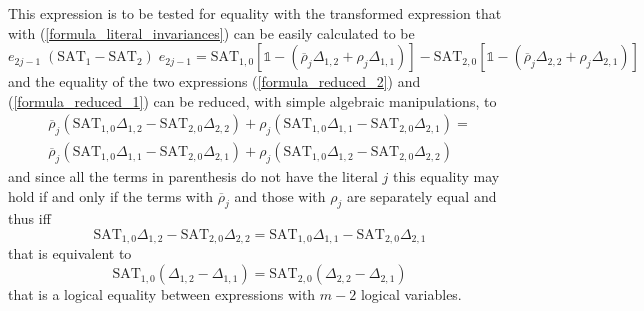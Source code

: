 \documentclass[a4paper,twoside,11pt]{article}
\begin{document}
This expression is to be tested for equality with the transformed expression that with (\ref{formula_literal_invariances}) can be easily calculated to be
\begin{equation}
\label{formula_reduced_2}
{e}_{2 j - 1} \; ({\ensuremath{\mbox{SAT}}}_1 - {\ensuremath{\mbox{SAT}}}_2) \; {e}_{2 j - 1} = {\ensuremath{\mbox{SAT}}}_{1,0} \left[{\ensuremath{\mathbb{1}}} - ({\overline{\ensuremath{\rho}}}_j \Delta_{1,2} + {\ensuremath{\rho}}_j \Delta_{1,1})\right] -  {\ensuremath{\mbox{SAT}}}_{2,0} \left[{\ensuremath{\mathbb{1}}} - ({\overline{\ensuremath{\rho}}}_j \Delta_{2,2} + {\ensuremath{\rho}}_j \Delta_{2,1})\right]
\end{equation}
and the equality of the two expressions (\ref{formula_reduced_2}) and (\ref{formula_reduced_1}) can be reduced, with simple algebraic manipulations, to
$$
\begin{array}{l}
{\overline{\ensuremath{\rho}}}_j ({\ensuremath{\mbox{SAT}}}_{1,0} \Delta_{1,2} - {\ensuremath{\mbox{SAT}}}_{2,0} \Delta_{2,2}) + {\ensuremath{\rho}}_j ({\ensuremath{\mbox{SAT}}}_{1,0} \Delta_{1,1} - {\ensuremath{\mbox{SAT}}}_{2,0} \Delta_{2,1}) = \\
{\overline{\ensuremath{\rho}}}_j ({\ensuremath{\mbox{SAT}}}_{1,0} \Delta_{1,1} - {\ensuremath{\mbox{SAT}}}_{2,0} \Delta_{2,1}) + {\ensuremath{\rho}}_j ({\ensuremath{\mbox{SAT}}}_{1,0} \Delta_{1,2} - {\ensuremath{\mbox{SAT}}}_{2,0} \Delta_{2,2})
\end{array}
$$
and since all the terms in parenthesis do not have the literal $j$ this equality may hold if and only if the terms with ${\overline{\ensuremath{\rho}}}_j$ and those with ${\ensuremath{\rho}}_j$ are separately equal and thus iff
$$
{\ensuremath{\mbox{SAT}}}_{1,0} \Delta_{1,2} - {\ensuremath{\mbox{SAT}}}_{2,0} \Delta_{2,2} = {\ensuremath{\mbox{SAT}}}_{1,0} \Delta_{1,1} - {\ensuremath{\mbox{SAT}}}_{2,0} \Delta_{2,1}
$$
that is equivalent to
$$
{\ensuremath{\mbox{SAT}}}_{1,0} (\Delta_{1,2} - \Delta_{1,1}) = {\ensuremath{\mbox{SAT}}}_{2,0} (\Delta_{2,2} - \Delta_{2,1})
$$
that is a logical equality between expressions with $m-2$ logical variables.
\end{document}
